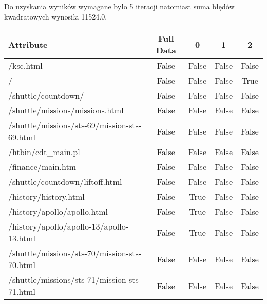 \documentclass[../EDI_Task1_Karwowski_Kowalewski.tex]{subfiles}
\begin{document}
{{{            Do uzyskania wyników wymagane było 5 iteracji natomiast suma błędów
            kwadratowych wynosiła 11524.0.
            \begin{table}[!htbp]
                \footnotesize
                \centering
                \begin{tabular}{|l|c|c|c|c|}
                    \hline
                    Attribute                                         & Full Data   &       0   &       1   &       2 \\ \hline
                    /ksc.html                                         &     False   &   False   &   False   &   False \\
                    /                                                 &     False   &   False   &   False   &    True \\
                    /shuttle/countdown/                               &     False   &   False   &   False   &   False \\
                    /shuttle/missions/missions.html                   &     False   &   False   &   False   &   False \\
                    /shuttle/missions/sts-69/mission-sts-69.html      &     False   &   False   &   False   &   False \\
                    /htbin/cdt\_main.pl                                &     False   &   False   &   False   &   False \\
                    /finance/main.htm                                 &     False   &   False   &   False   &   False \\
                    /shuttle/countdown/liftoff.html                   &     False   &   False   &   False   &   False \\
                    /history/history.html                             &     False   &    True   &   False   &   False \\
                    /history/apollo/apollo.html                       &     False   &    True   &   False   &   False \\
                    /history/apollo/apollo-13/apollo-13.html          &     False   &    True   &   False   &   False \\
                    /shuttle/missions/sts-70/mission-sts-70.html      &     False   &   False   &   False   &   False \\
                    /shuttle/missions/sts-71/mission-sts-71.html      &     False   &   False   &   False   &   False \\

\end{tabular}
\end{table}}}}
\end{document}
